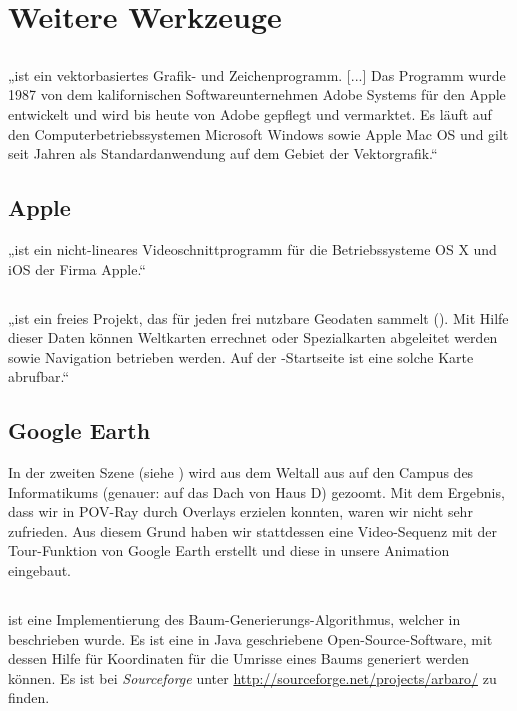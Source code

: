 \section{Weitere Werkzeuge}
	
	\subsection{\Illustrator}
	
	„\Illustrator [...] ist ein vektorbasiertes Grafik- und Zeichenprogramm. [...] Das Programm wurde 1987 von dem kalifornischen Softwareunternehmen Adobe Systems für den Apple  entwickelt und wird bis heute von Adobe gepflegt und vermarktet. Es läuft auf den Computerbetriebssystemen Microsoft Windows sowie Apple Mac OS und gilt seit Jahren als Standardanwendung auf dem Gebiet der Vektorgrafik.“ \cite{Wiki-Illustrator}
	
	\subsection{Apple \iMovie}
	
	„\iMovie ist ein nicht-lineares Videoschnittprogramm für die Betriebssysteme OS X und iOS der Firma Apple.“ \cite{Wiki-iMovie}
	
	\subsection{\OSM}
	
	„\OSM ist ein freies Projekt, das für jeden frei nutzbare Geodaten sammelt (). Mit Hilfe dieser Daten können Weltkarten errechnet oder Spezialkarten abgeleitet werden sowie Navigation betrieben werden. Auf der \OSM-Startseite ist eine solche Karte abrufbar.“ \cite{Wiki-OSM}
	
	\subsection{Google Earth}
	
	In der zweiten Szene (siehe ) wird aus dem Weltall aus auf den Campus des Informatikums (genauer: auf das Dach von Haus D) gezoomt. Mit dem Ergebnis, dass wir in POV-Ray durch Overlays erzielen konnten, waren wir nicht sehr zufrieden. Aus diesem Grund haben wir stattdessen eine Video-Sequenz mit der Tour-Funktion von Google Earth \cite{GoogleEarth} erstellt und diese in unsere Animation eingebaut. 
	
	\subsection{\Arbaro}
	
	\Arbaro ist eine Implementierung des Baum-Generierungs-Algorithmus, welcher in \cite{Weber+95} beschrieben wurde. Es ist eine in Java geschriebene Open-Source-Software, mit dessen Hilfe für \Povray Koordinaten für die Umrisse eines Baums generiert werden können. Es ist bei \textit{Sourceforge} unter \url{http://sourceforge.net/projects/arbaro/} zu finden.
